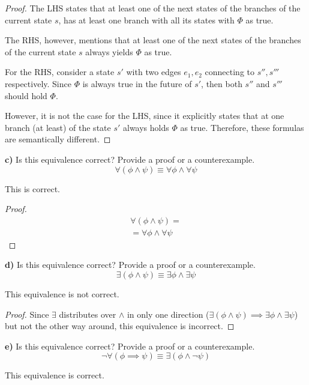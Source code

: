 \documentclass[titlepage, letterpaper, fleqn]{article}
\begin{document}
\begin{proof}
The LHS states that at least one of the next states of the branches of the current state \(s\), has at least one branch with all its states with \(\Phi\) as true.

The RHS, however, mentions that at least one of the next states of the branches of the current state \(s\) always yields \(\Phi\) as true.

For the RHS, consider a state \(s'\) with two edges \(e_1, e_2\) connecting to \(s'', s'''\) respectively. Since \(\Phi\) is always true in the future of \(s'\), then both \(s''\) and \(s'''\) should hold \(\Phi\).

However, it is not the case for the LHS, since it explicitly states that at one branch (at least) of the state \(s'\) always holds \(\Phi\) as true. Therefore, these formulas are semantically different.
\end{proof}

{\large \textbf{c)} Is this equivalence correct? Provide a proof or a counterexample.
\[\forall (\phi \wedge \psi) \equiv \forall \phi \wedge \forall \psi\]}

This is correct.

\begin{proof}
\begin{align*}
& \forall (\phi \wedge \psi) =
\\ & = \forall \phi \wedge \forall \psi & \tag*{$\forall$ distributes over $\wedge$ in both directions}
\end{align*}
\end{proof}

\pagebreak

{\large \textbf{d)} Is this equivalence correct? Provide a proof or a counterexample.
\[\exists (\phi \wedge \psi) \equiv \exists \phi \wedge \exists \psi\]}

This equivalence is not correct.

\begin{proof}
Since \(\exists\) distributes over \(\wedge\) in only one direction (\(\exists (\phi \wedge \psi) \implies \exists \phi \wedge \exists \psi\)) but not the other way around, this equivalence is incorrect.
\end{proof}

{\large \textbf{e)} Is this equivalence correct? Provide a proof or a counterexample.
\[\neg \forall(\phi \implies \psi) \equiv \exists (\phi \wedge \neg \psi)\]}

This equivalence is correct.
\end{document}
